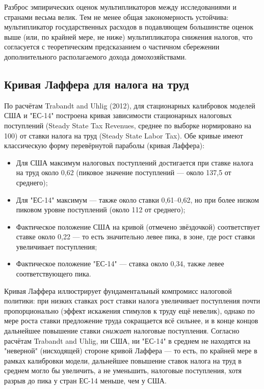 \documentclass[10pt,a4paper]{article}
\begin{document}
\begin{intuition}
Разброс эмпирических оценок мультипликаторов между исследованиями и странами весьма велик. Тем не менее общая закономерность устойчива: мультипликатор государственных расходов в подавляющем большинстве оценок выше (или, по крайней мере, не ниже) мультипликатора снижения налогов, что согласуется с теоретическим предсказанием о частичном сбережении дополнительного располагаемого дохода домохозяйствами.
\end{intuition}
 
\subsection{Кривая Лаффера для налога на труд}
 
По расчётам Trabandt and Uhlig (2012), для стационарных калибровок моделей США и "ЕС-14" построена кривая зависимости стационарных налоговых поступлений (Steady State Tax Revenues, среднее по выборке нормировано на 100) от ставки налога на труд (Steady State Labor Tax). Обе кривые имеют классическую форму перевёрнутой параболы (кривая Лаффера):
\begin{itemize}
\item Для США максимум налоговых поступлений достигается при ставке налога на труд около 0{,}62 (пиковое значение поступлений — около 137{,}5 от среднего);
\item Для "ЕС-14" максимум — также около ставки 0{,}61--0{,}62, но при более низком пиковом уровне поступлений (около 112 от среднего);
\item Фактическое положение США на кривой (отмечено звёздочкой) соответствует ставке около 0{,}22 — то есть значительно левее пика, в зоне, где рост ставки увеличивает поступления;
\item Фактическое положение "ЕС-14" — ставка около 0{,}34, также левее соответствующего пика.
\end{itemize}
 
\begin{intuition}
Кривая Лаффера иллюстрирует фундаментальный компромисс налоговой политики: при низких ставках рост ставки налога увеличивает поступления почти пропорционально (эффект искажения стимулов к труду ещё невелик), однако по мере роста ставки предложение труда сокращается всё сильнее, и в конце концов дальнейшее повышение ставки \emph{снижает} налоговые поступления. Согласно расчётам Trabandt and Uhlig, ни США, ни "ЕС-14" в среднем не находятся на "неверной" (нисходящей) стороне кривой Лаффера — то есть, по крайней мере в рамках калибровки модели, дальнейшее повышение ставок налога на труд в среднем могло бы увеличить, а не уменьшить, налоговые поступления, хотя разрыв до пика у стран ЕС-14 меньше, чем у США.
\end{intuition}
 
\end{document}
